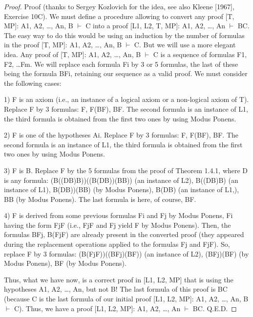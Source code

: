 \begin{proof}
Proof (thanks to Sergey Kozlovich for the idea, see also Kleene [1967], Exercise 10C).
We must define a procedure allowing to convert any proof [T, MP]: A1, A2, \ldots , An, B \(\vdash\) C into a proof [L1, L2, T, MP]: A1, A2, \ldots , An \(\vdash\) B\IMPLIES C.
The easy way to do this would be using an induction by the number of formulas in the proof [T, MP]: A1, A2, \ldots , An, B \(\vdash\) C.
But we will use a more elegant idea.
Any proof of [T, MP]: A1, A2, \ldots , An, B \(\vdash\) C is a sequence of formulas F1, F2, \ldots Fm.
We will replace each formula Fi by 3 or 5 formulas, the last of these being the formula B\IMPLIES Fi, retaining our sequence as a valid proof.
We must consider the following cases:

1) F is an axiom (i.e., an instance of a logical axiom or a non-logical axiom of T).
Replace F by 3 formulas: F, F\IMPLIES (B\IMPLIES F), B\IMPLIES F.
The second formula is an instance of L1, the third formula is obtained from the first two ones by using Modus Ponens.

2) F is one of the hypotheses Ai.
Replace F by 3 formulas: F, F\IMPLIES (B\IMPLIES F), B\IMPLIES F.
The second formula is an instance of L1, the third formula is obtained from the first two ones by using Modus Ponens.

3) F is B.
Replace F by the 5 formulas from the proof of Theorem 1.4.1, where D is any formula: (B\IMPLIES ((D\IMPLIES B)\IMPLIES B))\IMPLIES ((B\IMPLIES (D\IMPLIES B))\IMPLIES (B\IMPLIES B)) (an instance of L2), B\IMPLIES ((D\IMPLIES B)\IMPLIES B) (an instance of L1), B\IMPLIES (D\IMPLIES B))\IMPLIES (B\IMPLIES B) (by Modus Ponens), B\IMPLIES (D\IMPLIES B) (an instance of L1,), B\IMPLIES B (by Modus Ponens).
The last formula is here, of course, B\IMPLIES F.

4) F is derived from some previous formulas Fi and Fj by Modus Ponens, Fi having the form Fj\IMPLIES F (i.e., Fj\IMPLIES F and Fj yield F by Modus Ponens).
Then, the formulas B\IMPLIES Fj, B\IMPLIES (Fj\IMPLIES F) are already present in the converted proof (they appeared during the replacement operations applied to the formulas Fj and Fj\IMPLIES F).
So, replace F by 3 formulas: (B\IMPLIES (Fj\IMPLIES F))\IMPLIES ((B\IMPLIES Fj)\IMPLIES (B\IMPLIES F)) (an instance of L2), (B\IMPLIES Fj)\IMPLIES (B\IMPLIES F) (by Modus Ponens), B\IMPLIES F (by Modus Ponens).

Thus, what we have now, is a correct proof in [L1, L2, MP] that is using the hypotheses A1, A2, \ldots , An, but not B! The last formula of this proof is B\IMPLIES C (because C is the last formula of our initial proof [L1, L2, MP]: A1, A2, \ldots , An, B \(\vdash\) C).
Thus, we have a proof [L1, L2, MP]: A1, A2, \ldots , An \(\vdash\) B\IMPLIES C. Q.E.D.
\end{proof}

